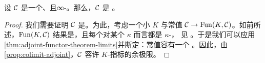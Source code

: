 \begin{corollary}\label{cor:accessible-complete-presentable}
设 $\mathcal{C}$ 是一个\trLocallySmall{}、\trAccessible{}且\trComplete{}∞-\trCategory{}。那么，$\mathcal{C}$ 是%
\trPresentable{}。
\end{corollary}

\begin{proof}
我们需要证明 $\mathcal{C}$ 是\trCocomplete{}。为此，考虑一个小\trSimplicialSet{} $K$
与常值\trFunctor{} $\mathcal{C} \to \mathrm{Fun}(K, \mathcal{C})$。如前所述，$\mathrm{Fun}(K, \mathcal{C})$
结果是\trLocallySmall{}，且每个\trObject{}对某个 $\kappa$ 而言都是 $\kappa$-\trCompact{}，
见 \cite[Proposition 5.3.4.13]{Lur09}。于是我们可以应用%
\cref{thm:adjoint-functor-theorem-limits}并断定：常值\trFunctor{}容有一个%
\trLeftAdjoint{}。因此，由\cref{prop:colimit-adjoint}，$\mathcal{C}$ 容许 $K$-指标的余极限。
\end{proof}
